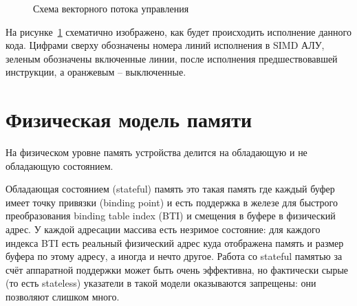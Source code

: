 \begin{figure}[ht]
    \caption{Схема векторного потока управления}\label{fig:HW-goto-example}
\end{figure}

На рисунке~\ref{fig:HW-goto-example} схематично изображено, как будет происходить исполнение данного кода. Цифрами сверху обозначены номера линий исполнения в SIMD АЛУ, зеленым обозначены включенные линии, после исполнения предшествовавшей инструкции, а оранжевым -- выключенные.

\section{Физическая модель памяти}\label{sec:overview/physmem}

На физическом уровне память устройства делится на обладающую и не обладающую состоянием.

Обладающая состоянием (stateful) память это такая память где каждый буфер имеет точку привязки (binding point) и есть поддержка в железе для быстрого преобразования binding table index (BTI) и смещения в буфере в физический адрес. У каждой адресации массива есть незримое состояние: для каждого индекса BTI есть реальный физический адрес куда отображена память и размер буфера по этому адресу, а иногда и нечто другое. Работа со stateful памятью за счёт аппаратной поддержки может быть очень эффективна, но фактически сырые (то есть stateless) указатели в такой модели оказываются запрещены: они позволяют слишком много.

